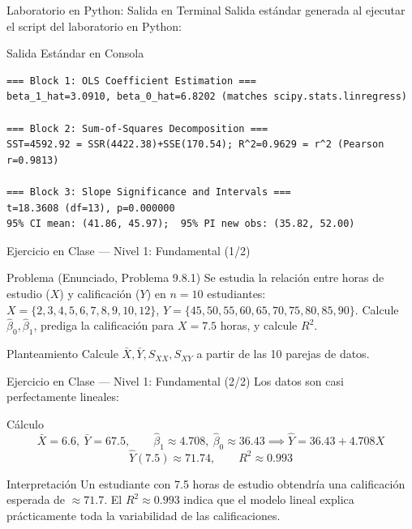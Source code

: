 \documentclass[10pt, aspectratio=169]{beamer}
\begin{document}
\begin{frame}[fragile]{Laboratorio en Python: Salida en Terminal}
  \scriptsize
  Salida estándar generada al ejecutar el script del laboratorio en Python:
  \vspace{0.02cm}
  \begin{block}{Salida Estándar en Consola}
    \fontsize{3.8pt}{4.6pt}\selectfont
    \begin{verbatim}
=== Block 1: OLS Coefficient Estimation ===
beta_1_hat=3.0910, beta_0_hat=6.8202 (matches scipy.stats.linregress)

=== Block 2: Sum-of-Squares Decomposition ===
SST=4592.92 = SSR(4422.38)+SSE(170.54); R^2=0.9629 = r^2 (Pearson r=0.9813)

=== Block 3: Slope Significance and Intervals ===
t=18.3608 (df=13), p=0.000000
95% CI mean: (41.86, 45.97);  95% PI new obs: (35.82, 52.00)
    \end{verbatim}
  \end{block}
\end{frame}

\begin{frame}{Ejercicio en Clase --- Nivel 1: Fundamental (1/2)}
  \footnotesize
  \begin{block}{Problema (Enunciado, Problema 9.8.1)}
    Se estudia la relación entre horas de estudio ($X$) y calificación ($Y$) en $n=10$ estudiantes: $X=\{2,3,4,5,6,7,8,9,10,12\}$, $Y=\{45,50,55,60,65,70,75,80,85,90\}$. Calcule $\hat\beta_0,\hat\beta_1$, prediga la calificación para $X=7.5$ horas, y calcule $R^2$.
  \end{block}

  \vspace{0.15cm}
  \pause
  \begin{alertblock}{Planteamiento}
    Calcule $\bar X,\bar Y,S_{XX},S_{XY}$ a partir de las 10 parejas de datos.
  \end{alertblock}
\end{frame}

\begin{frame}{Ejercicio en Clase --- Nivel 1: Fundamental (2/2)}
  \scriptsize
  Los datos son casi perfectamente lineales: \pause

  \vspace{0.05cm}
  \begin{block}{Cálculo}
    $$\bar X=6.6,\ \bar Y=67.5, \qquad \hat\beta_1\approx4.708,\ \hat\beta_0\approx36.43 \implies \hat Y=36.43+4.708X$$
    $$\hat Y(7.5)\approx71.74, \qquad R^2\approx0.993$$
  \end{block}

  \vspace{0.05cm}
  \pause
  \begin{alertblock}{Interpretación}
    Un estudiante con 7.5 horas de estudio obtendría una calificación esperada de $\approx71.7$. El $R^2\approx0.993$ indica que el modelo lineal explica prácticamente toda la variabilidad de las calificaciones.
  \end{alertblock}
\end{frame}
\end{document}
